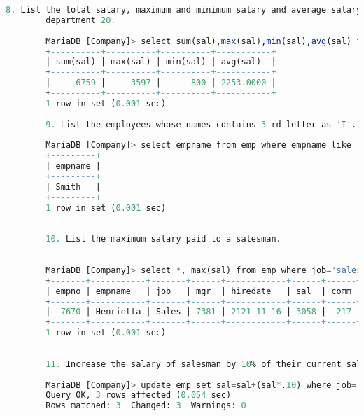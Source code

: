 \documentclass{article}
\begin{document}
\begin{lstlisting}[language=SQL]
		8. List the total salary, maximum and minimum salary and average salary of the employees, for 
		department 20. 
		
		MariaDB [Company]> select sum(sal),max(sal),min(sal),avg(sal) from emp where deptno=20; 
		+----------+----------+----------+-----------+ 
		| sum(sal) | max(sal) | min(sal) | avg(sal)  | 
		+----------+----------+----------+-----------+ 
		|     6759 |     3597 |      800 | 2253.0000 | 
		+----------+----------+----------+-----------+ 
		1 row in set (0.001 sec) 
		
		9. List the employees whose names contains 3 rd letter as 'I'. 
		
		MariaDB [Company]> select empname from emp where empname like '__i%'; 
		+---------+ 
		| empname | 
		+---------+ 
		| Smith   | 
		+---------+ 
		1 row in set (0.001 sec) 
		
		
		10. List the maximum salary paid to a salesman. 
		
		
		MariaDB [Company]> select *, max(sal) from emp where job='sales'; 
		+-------+-----------+-------+------+------------+------+------+--------+----------+ 
		| empno | empname   | job   | mgr  | hiredate   | sal  | comm | deptno | max(sal) | 
		+-------+-----------+-------+------+------------+------+------+--------+----------+ 
		|  7670 | Henrietta | Sales | 7381 | 2121-11-16 | 3058 |  217 |     30 |     3058 | 
		+-------+-----------+-------+------+------------+------+------+--------+----------+ 
		1 row in set (0.001 sec) 
		
		
		11. Increase the salary of salesman by 10% of their current salary. 
		
		MariaDB [Company]> update emp set sal=sal+(sal*.10) where job='sales'; 
		Query OK, 3 rows affected (0.054 sec) 
		Rows matched: 3  Changed: 3  Warnings: 0 
		
	\end{lstlisting} 
	
\end{document}
